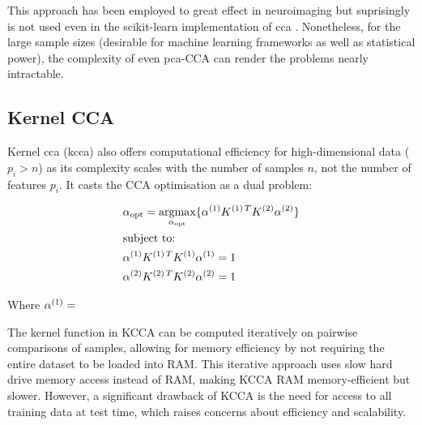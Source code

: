 This approach has been employed to great effect in neuroimaging but suprisingly is not used even in the scikit-learn implementation of \acrshort{cca} \citep{pedregosa2011scikit}.
Nonetheless, for the large sample sizes (desirable for machine learning frameworks as well as statistical power), the complexity of even \acrshort{pca}-CCA can render the problems nearly intractable.

\subsection{Kernel CCA}

Kernel \acrshort{cca} (\acrshort{kcca}) also offers computational efficiency for high-dimensional data (\(p_i>n\)) as its complexity scales with the number of samples \(n\), not the number of features \(p_i\).
It casts the CCA optimisation as a dual problem:

\begin{align}
    & \alpha_{\text{opt}}=\underset{\alpha_{\text{opt}}}{\mathrm{argmax}}\{ \alpha^{(1)}K^{(1)\,T}K^{(2)}\alpha^{(2)}  \} \\
    & \text{subject to:} \notag                                                                                            \\
    & \alpha^{(1)}K^{(1)\,T}K^{(1)}\alpha^{(1)}=1 \notag                                                                  \\
    & \alpha^{(2)}K^{(2)\,T}K^{(2)}\alpha^{(2)}=1 \notag
\end{align}

Where \(\alpha^{(1)}=\)

The kernel function in KCCA can be computed iteratively on pairwise comparisons of samples, allowing for memory efficiency by not requiring the entire dataset to be loaded into RAM.
This iterative approach uses slow hard drive memory access instead of RAM, making KCCA RAM memory-efficient but slower.
However, a significant drawback of KCCA is the need for access to all training data at test time, which raises concerns about efficiency and scalability.

